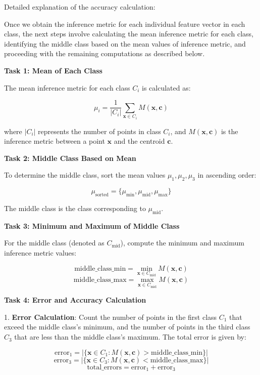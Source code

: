 Detailed explanation of the accuracy calculation:

Once we obtain the inference metric for each individual feature vector in each class, the next steps involve calculating the mean inference metric for each class, identifying the middle class based on the mean values of inference metric, and proceeding with the remaining computations as described below.

\textbf{Task 1: Mean of Each Class}

The mean inference metric for each class \( C_i \) is calculated as:

\[
\mu_i = \frac{1}{|C_i|} \sum_{\mathbf{x} \in C_i} M(\mathbf{x}, \mathbf{c})
\]

where \( |C_i| \) represents the number of points in class \( C_i \), and \( M(\mathbf{x}, \mathbf{c}) \) is the inference metric between a point \( \mathbf{x} \) and the centroid \( \mathbf{c} \).

\textbf{Task 2: Middle Class Based on Mean}

To determine the middle class, sort the mean values \( \mu_1, \mu_2, \mu_3 \) in ascending order:

\[
\mu_{\text{sorted}} = \{\mu_{\text{min}}, \mu_{\text{mid}}, \mu_{\text{max}}\}
\]

The middle class is the class corresponding to \( \mu_{\text{mid}} \).

\textbf{Task 3: Minimum and Maximum of Middle Class}

For the middle class (denoted as \( C_{\text{mid}} \)), compute the minimum and maximum inference metric values:

\[
\text{middle\_class\_min} = \min_{\mathbf{x} \in C_{\text{mid}}} M(\mathbf{x}, \mathbf{c})
\]
\[
\text{middle\_class\_max} = \max_{\mathbf{x} \in C_{\text{mid}}} M(\mathbf{x}, \mathbf{c})
\]

\textbf{Task 4: Error and Accuracy Calculation}

1. \textbf{Error Calculation}: Count the number of points in the first class \( C_1 \) that exceed the middle class's minimum, and the number of points in the third class \( C_3 \) that are less than the middle class's maximum. The total error is given by:

\[
\text{error}_1 = \left| \{\mathbf{x} \in C_1 : M(\mathbf{x}, \mathbf{c}) > \text{middle\_class\_min} \} \right|
\]
\[
\text{error}_3 = \left| \{\mathbf{x} \in C_3 : M(\mathbf{x}, \mathbf{c}) < \text{middle\_class\_max} \} \right|
\]
\[
\text{total\_errors} = \text{error}_1 + \text{error}_3
\]

